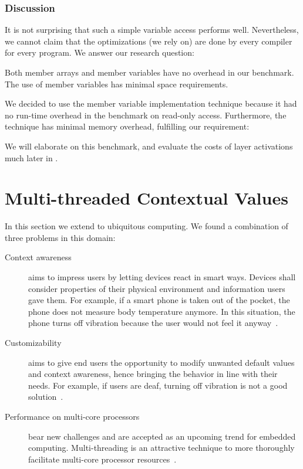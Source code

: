 \subsubsection{Discussion}

It is not surprising that such a simple variable access performs well.
Nevertheless, we cannot claim that the optimizations (we rely on) are done by every compiler for every program.
We answer our research question:
\rqFrontendTradeOff*

\begin{finding}
Both member arrays and member variables have no overhead in our benchmark.
The use of member variables has minimal space requirements.
\end{finding}

We decided to use the member variable implementation technique because it had no run-time overhead in the benchmark on read-only access.
Furthermore, the technique has minimal memory overhead, fulfilling our requirement:
\reqFast*

We will elaborate on this benchmark, and evaluate the costs of layer activations much later in .
















\section{Multi-threaded Contextual Values}
\label{sec:seus}

In this section we extend \elektra{} to ubiquitous computing.
We found a combination of three problems in this domain:

\begin{description}
\item[Context awareness]
aims to impress users by letting devices react in smart ways.
Devices shall consider properties of their physical environment and information users gave them.
For example, if a smart phone is taken out of the pocket, the phone does not measure body temperature anymore.
In this situation, the phone turns off vibration because the user would not feel it anyway~\cite{raab2015global}.
\item [Customizability]
aims to give end users the opportunity to modify unwanted default values and context awareness, hence bringing the behavior in line with their needs.
For example, if users are deaf, turning off vibration is not a good solution~\cite{raab2015global}.
\item [Performance on multi-core processors]
bear new challenges and are accepted as an upcoming trend for embedded computing.
Multi-threading is an attractive technique to more thoroughly facilitate multi-core processor resources~\cite{raab2015global}.
\end{description}

